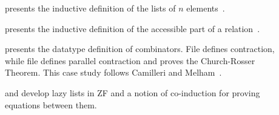 \begin{description}
\item[]
presents the inductive definition of the lists of $n$ elements~\cite{paulin92}.

\item[]
presents the inductive definition of the accessible part of a
relation~\cite{paulin92}. 

\item[]
  presents the datatype definition of combinators.  File
   defines contraction, while file
   defines parallel contraction and
  proves the Church-Rosser Theorem.  This case study follows Camilleri and
  Melham~\cite{camilleri92}. 

\item[]
  and  develop lazy lists in ZF and a notion
  of co-induction for proving equations between them.
\end{description}



